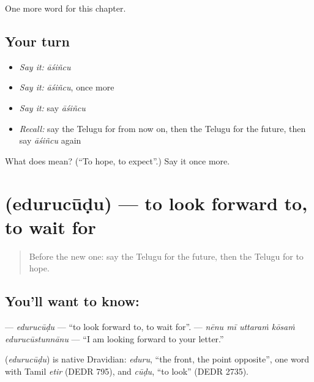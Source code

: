 \begin{grammarlens}[title={What you've built}]
One more word for this chapter.
\end{grammarlens}

\subsection*{Your turn}
\begin{itemize}
\raggedright
  \item \emph{Say it:} \emph{āśiñcu}
  \item \emph{Say it:} \emph{āśiñcu}, once more
  \item \emph{Say it:} say \emph{āśiñcu}
  \item \emph{Recall:} say the Telugu for from now on, then the Telugu for the future, then say \emph{āśiñcu} again
\end{itemize}

\begin{tcolorbox}[breakable,colback=teal!4,colframe=teal!35!black,title={Before you move on}]
What does  mean? (\textquotedblleft{}To hope, to expect\textquotedblright{}.) Say it once more.
\end{tcolorbox}
\section[\texorpdfstring{\te{ఎదురుచూడు} (edurucūḍu)}{ఎదురుచూడు (edurucūḍu)}]{ (edurucūḍu) — to look forward to, to wait for}

\label{lesson:TE-C155-edurucudu}



\begin{quote}
Before the new one: say the Telugu for the future, then the Telugu for to hope.
\end{quote}

\subsection*{You'll want to know: }
\textbf{} — \emph{edurucūḍu} — \textquotedblleft{}to look forward to, to wait for\textquotedblright{}. \textbf{    } — \emph{nēnu mī uttaraṁ kōsaṁ edurucūstunnānu} — \textquotedblleft{}I am looking forward to your letter.\textquotedblright{}

\begin{cousinweb}
\textbf{} (\emph{edurucūḍu}) is native Dravidian: \emph{eduru}, \textquotedblleft{}the front, the point opposite\textquotedblright{}, one word with Tamil \emph{etir} (DEDR 795), and \emph{cūḍu}, \textquotedblleft{}to look\textquotedblright{} (DEDR 2735).
\end{cousinweb}

